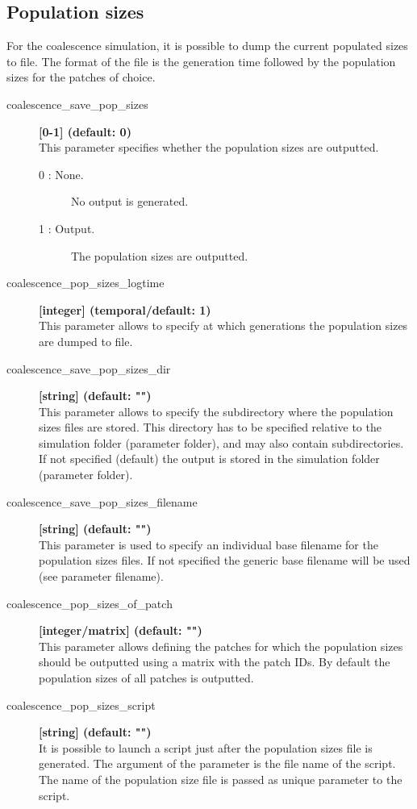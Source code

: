 \documentclass[letterpaper,12pt,oneside]{book}
\begin{document}
\subsection{Population sizes}\label{coalPopSizes}
For the coalescence simulation, it is possible to dump the current populated sizes to file. The format of the file is the generation time followed by the population sizes for the patches of choice.

\begin{description} 
    \item[coalescence\_save\_pop\_sizes] \textbf{[0-1] (default: 0)} \\
    This parameter specifies whether the population sizes are outputted.
    \begin{description}
        \item [0 : None.] No output is generated.
        \item [1 : Output.] The population sizes are outputted.
    \end{description} 
    
    \item[coalescence\_pop\_sizes\_logtime] \textbf{[integer] (temporal/default: 1)}\\
    This parameter allows to specify at which generations the population sizes are dumped to file. 
    
\item[coalescence\_save\_pop\_sizes\_dir] \textbf{[string] (default: "")}\\
This parameter allows to specify the subdirectory where the population sizes files are stored. This directory has to be specified relative to the simulation folder (parameter \textsf{folder}), and may also contain subdirectories. If not specified (default) the output is stored in the simulation folder (parameter \textsf{folder}).

\item[coalescence\_save\_pop\_sizes\_filename] \textbf{[string] (default: "")}\\
This parameter is used to specify an individual base filename for the population sizes files. If not specified the generic base filename will be used (see parameter \textsf{filename}).

    \item[coalescence\_pop\_sizes\_of\_patch] \textbf{[integer/matrix] (default: "")}\\
    This parameter allows defining the patches for which the population sizes should be outputted using a matrix with the patch IDs. By default the population sizes of all patches is outputted.
    \item[coalescence\_pop\_sizes\_script] \textbf{[string] (default: "")}\\
    It is possible to launch a script just after the population sizes file is generated. The argument of the parameter is the file name of the script. The name of the population size file is passed as unique parameter to the script. 


\end{description}
\end{document}
